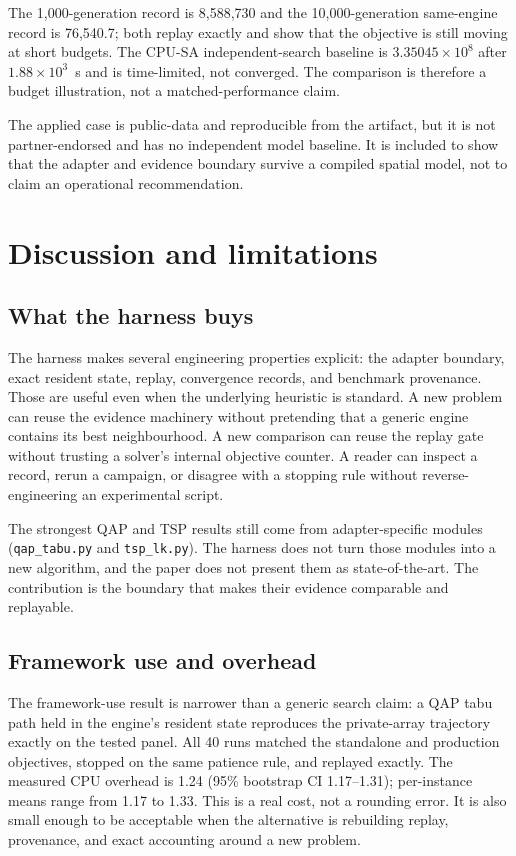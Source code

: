 \documentclass[pdflatex,sn-mathphys-num]{sn-jnl}
\begin{document}
The 1,000-generation record is 8,588,730 and the 10,000-generation same-engine record is
76,540.7; both replay exactly and show that the objective is still moving at short budgets. The
CPU-SA independent-search baseline is $3.35045\times10^8$ after $1.88\times10^3$~s and is time-limited,
not converged. The comparison is therefore a budget illustration, not a matched-performance claim.

The applied case is public-data and reproducible from the artifact, but it is not partner-endorsed
and has no independent model baseline. It is included to show that the adapter and evidence boundary
survive a compiled spatial model, not to claim an operational recommendation.

\section{Discussion and limitations}
\label{sec:discussion}

\subsection{What the harness buys}

The harness makes several engineering properties explicit: the adapter boundary, exact resident state,
replay, convergence records, and benchmark provenance. Those are useful even when the underlying
heuristic is standard. A new problem can reuse the evidence machinery without pretending that a
generic engine contains its best neighbourhood. A new comparison can reuse the replay gate without
trusting a solver's internal objective counter. A reader can inspect a record, rerun a campaign, or
disagree with a stopping rule without reverse-engineering an experimental script.

The strongest QAP and TSP results still come from adapter-specific modules
(\texttt{qap\_tabu.py} and \texttt{tsp\_lk.py}). The harness does not turn those modules into a new
algorithm, and the paper does not present them as state-of-the-art. The contribution is the boundary
that makes their evidence comparable and replayable.

\subsection{Framework use and overhead}

The framework-use result is narrower than a generic search claim: a QAP tabu path held in the engine's
resident state reproduces the private-array trajectory exactly on the tested panel. All 40 runs matched
the standalone and production objectives, stopped on the same patience rule, and replayed exactly.
The measured CPU overhead is 1.24 (95\% bootstrap CI 1.17--1.31); per-instance means range from
1.17 to 1.33. This is a real cost, not a rounding error. It is also small enough to be acceptable
when the alternative is rebuilding replay, provenance, and exact accounting around a new problem.
\end{document}
